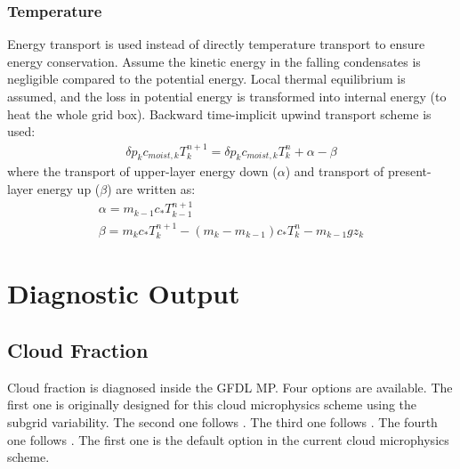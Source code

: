 \documentclass[letterpaper,titlepage,10pt]{article}
\numberwithin{equation}{section}
\begin{document}

\subsubsection*{Temperature}

Energy transport is used instead of directly temperature transport to ensure energy conservation. Assume the kinetic energy in the falling condensates is negligible compared to the potential energy. Local thermal equilibrium is assumed, and the loss in potential energy is transformed into internal energy (to heat the whole grid box). Backward time-implicit upwind transport scheme is used:
\begin{gather}
	\delta p_k c_{moist,k} T^{n+1}_k = \delta p_k c_{moist,k} T^n_k + \alpha - \beta
\end{gather}
where the transport of upper-layer energy down ($\alpha$) and transport of present-layer energy up ($\beta$) are written as:
\begin{gather}
	\alpha = m_{k-1} c_* T^{n+1}_{k-1} \\
	\beta = m_k c_* T^{n+1}_{k} - \left(m_k - m_{k-1} \right) c_* T^n_k - m_{k-1} g z_k
\end{gather}


\newpage
\section{Diagnostic Output}


\subsection{Cloud Fraction}

Cloud fraction is diagnosed inside the GFDL MP. Four options are available. The first one is originally designed for this cloud microphysics scheme using the subgrid variability. The second one follows \citet{xu1996asem}. The third one follows \citet{park2016arev}. The fourth one follows \citet{gultepe2007clou}.  The first one is the default option in the current cloud microphysics scheme.

\end{document}
